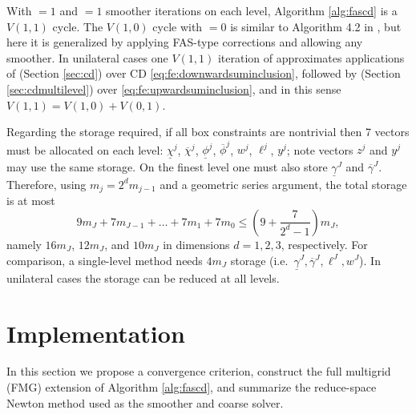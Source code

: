 \documentclass[review,hidelinks,onefignum,onetabnum,final]{siamart220329}  %
\begin{document}
 
With  $=1$ and  $=1$ smoother iterations on each level, Algorithm \ref{alg:fascd} is a $V(1,1)$ cycle.  The $V(1,0)$ cycle with  $=0$ is similar to Algorithm 4.2 in \cite{GraeserKornhuber2009}, but here it is generalized by applying FAS-type corrections and allowing any smoother.  In unilateral cases one $V(1,1)$ iteration of  approximates applications of  (Section \ref{sec:cd}) over CD \eqref{eq:fe:downwardsuminclusion}, followed by  (Section \ref{sec:cdmultilevel}) over \eqref{eq:fe:upwardsuminclusion}, and in this sense $V(1,1)=V(1,0)+V(0,1)$.

Regarding the storage required, if all box constraints are nontrivial then 7 vectors must be allocated on each level: $\underline{\chi}^j$, $\overline{\chi}^j$, $\underline{\phi}^j$, $\overline{\phi}^j$, $w^j$, $\ell^j$, $y^j$; note vectors $z^j$ and $y^j$ may use the same storage.  On the finest level one must also store $\underline{\gamma}^J$ and $\overline{\gamma}^J$.  Therefore, using $m_j=2^d m_{j-1}$ and a geometric series argument, the total storage is at most
\begin{equation}
9 m_J + 7 m_{J-1} + \dots + 7 m_1 + 7 m_0 \le \left(9 + \frac{7}{2^d - 1}\right) m_J,
\end{equation}
namely $16m_J$, $12m_J$, and $10m_J$ in dimensions $d=1,2,3$, respectively.  For comparison, a single-level method needs $4 m_J$ storage (i.e.~$\underline{\gamma}^J,\overline{\gamma}^J,\ell^J,w^J$).  In unilateral cases the storage can be reduced at all levels.


\section{Implementation} \label{sec:implementation}

In this section we propose a convergence criterion, construct the full multigrid (FMG) extension of Algorithm \ref{alg:fascd}, and summarize the reduce-space Newton method used as the smoother and coarse solver.
\end{document}

